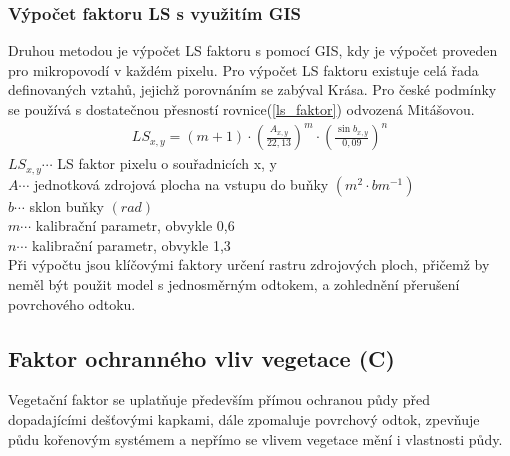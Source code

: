 \subsubsection{Výpočet faktoru LS s využitím GIS} 
Druhou metodou je výpočet LS faktoru s pomocí GIS, kdy je výpočet proveden pro mikropovodí v každém pixelu. Pro výpočet LS faktoru existuje celá řada definovaných vztahů, jejichž porovnáním se zabýval Krása\cite{Krasa2010}. Pro české podmínky se používá s dostatečnou přesností rovnice(\ref{ls_faktor}) odvozená Mitášovou\cite{Mitasova1998}.\cite{Dostal2014}
\begin{align}
   \label{ls_faktor} LS_{x,y}=\left( m+1 \right)\cdot\left(\frac{A_{x,y}}{22,13}\right)^m \cdot \left(\frac{\sin b_{x,y}}{0,09}\right)^n
\end{align}
\hspace*{2cm}$LS_{x,y} \cdots$ LS faktor pixelu o souřadnicích x, y  \\ \hspace*{2cm}$A \cdots$ jednotková zdrojová plocha na vstupu do buňky $\left( m^2\cdot bm^{-1} \right)$ \\ 
\hspace*{2cm}$b \cdots$ sklon buňky $\left( rad \right)$ \\ 
\hspace*{2cm}$m \cdots$ kalibrační parametr, obvykle 0,6\\ 
\hspace*{2cm}$n \cdots$ kalibrační parametr, obvykle 1,3\\ 

Při výpočtu jsou klíčovými faktory určení rastru zdrojových ploch, přičemž by neměl být použit model s jednosměrným odtokem, a zohlednění přerušení povrchového odtoku.\cite{Krasa2010}

\subsection{Faktor ochranného vliv vegetace (C)}
Vegetační faktor se uplatňuje především přímou ochranou půdy před dopadajícími dešťovými kapkami, dále zpomaluje povrchový odtok, zpevňuje půdu kořenovým systémem a nepřímo se vlivem vegetace mění i vlastnosti půdy.


